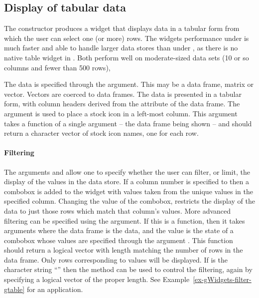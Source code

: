 \subsection{Display of tabular data}
\label{sec:gWidgets-tabular-data-display}


The  constructor produces a widget that displays data in a tabular form
from which the user can select one (or more) rows. The widgets
performance under  is much faster and able to handle larger
data stores than under , as there is no native table widget in \tcltk. Both perform well on moderate-sized data sets (10 or so columns and fewer than 500 rows),

The data is specified through the 
argument. This may be a data frame, matrix or vector. Vectors are
coerced to data frames.  The data is presented in a tabular form, with
column headers derived from the  attribute of the data
frame.  The  argument is used to place a
stock icon in a left-most column.  This argument takes a function of a
single argument -- the data frame being shown -- and should return a
character vector of stock icon names, one for each row. 

\paragraph{Filtering}
The arguments  and
 allow one to specify whether the user
can filter, or limit, the display of the values in the data store. If
a column number is specified to  then a combobox
is added to the widget with values taken from the unique values in the
specified column. Changing the value of the combobox, restricts the
display of the data to just those rows which match that column's
values. More advanced filtering can be specified using the
 argument. If this is a function, then it takes
arguments  where the data frame is the
data, and the  value is the state of a combobox whose
values are specified through the argument
. This function should return a logical
vector with length matching the number of rows in the data frame.
Only rows corresponding to  values will be displayed. If
 is the character string ``'' then the
 method can be used to control the
filtering, again by specifying a logical vector of the proper
length. See Example~\ref{ex-gWidgets-filter-gtable} for an
application.

